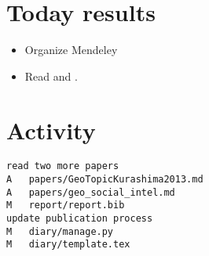 \section*{Today results}
\begin{itemize}
	\item Organize Mendeley
	\item Read \cite{Caverlee2013} and \cite{GeoTopicKurashima2013}.
\end{itemize}

\section*{Activity}
\begin{verbatim}
read two more papers
A	papers/GeoTopicKurashima2013.md
A	papers/geo_social_intel.md
M	report/report.bib
update publication process
M	diary/manage.py
M	diary/template.tex
\end{verbatim}